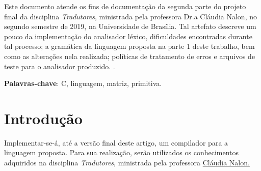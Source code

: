 \documentclass[
	article,			%
	11pt,				%
	oneside,			%
	a4paper,			%
	english,			%
	brazil,				%
	sumario=tradicional
	]{abntex2}
\begin{document}

\frenchspacing 


%
%

\maketitle





\begin{resumoumacoluna}
 Este documento atende os fins de documentação da segunda
 parte do projeto final da disciplina \textit{Tradutores},
 ministrada pela professora Dr.a Cláudia Nalon, no segundo semestre de 2019, na Universidade de Brasília. Tal artefato descreve um pouco da implementação do analisador léxico, dificuldades encontradas durante tal processo; a gramática da linguagem proposta na parte 1 deste trabalho, bem como as alterações nela realizada; políticas de tratamento de erros e arquivos de teste para o analisador produzido.
  \cite{gramatica}.
 \vspace{\onelineskip}
 
 \noindent
 \textbf{Palavras-chave}: C, linguagem, matriz, primitiva.
\end{resumoumacoluna}




\newcommand{\terminal}[1]{ \bnfpn{\textbf{#1}} }

\newcommand{\production}[1]{\bnfpn{\textit{#1}}}
\newcommand{\IT}[1]{\textit{#1}}


\section{Introdução}
Implementar-se-á, até a versão final deste artigo, um compilador para a linguagem proposta. Para sua realização, serão utilizados os conhecimentos adquiridos na disciplina \textit{Tradutores}, ministrada pela professora \hyperref{http://lattes.cnpq.br/7793795625581127}{}{}{Cláudia Nalon.}
\end{document}
